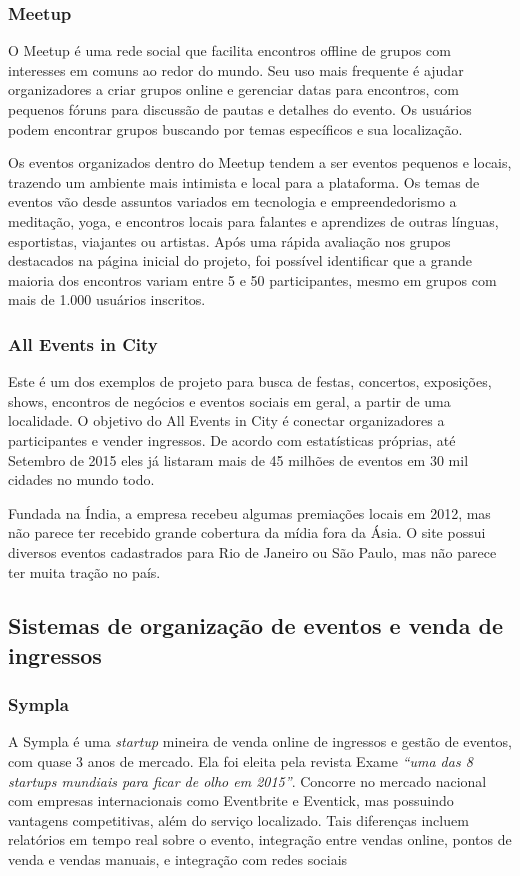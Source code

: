 \documentclass[12pt,a4paper,twoside,hyphens,english,brazil]{abntex2}
\begin{document}
\subsubsection*{Meetup}\label{sec:meetup}
O Meetup é uma rede social que facilita encontros offline de grupos com interesses em comuns ao redor do mundo. Seu uso mais frequente é ajudar organizadores a criar grupos online e gerenciar datas para encontros, com pequenos fóruns para discussão de pautas e detalhes do evento. Os usuários podem encontrar grupos buscando por temas específicos e sua localização.

Os eventos organizados dentro do Meetup tendem a ser eventos pequenos e locais, trazendo um ambiente mais intimista e local para a plataforma. Os temas de eventos vão desde assuntos variados em tecnologia e empreendedorismo a meditação, yoga, e encontros locais para falantes e aprendizes de outras línguas, esportistas, viajantes ou artistas. Após uma rápida avaliação nos grupos destacados na página inicial do projeto, foi possível identificar que a grande maioria dos encontros variam entre 5 e 50 participantes, mesmo em grupos com mais de 1.000 usuários inscritos.

\subsubsection*{All Events in City}
Este é um dos exemplos de projeto para busca de festas, concertos, exposições, shows, encontros de negócios e eventos sociais em geral, a partir de uma localidade. O objetivo do All Events in City é conectar organizadores a participantes e vender ingressos. De acordo com estatísticas próprias, até Setembro de 2015 eles já listaram mais de 45 milhões de eventos em 30 mil cidades no mundo todo\cite{alleventsincity-wikipedia}.

Fundada na Índia, a empresa recebeu algumas premiações locais em 2012, mas não parece ter recebido grande cobertura da mídia fora da Ásia. O site possui diversos eventos cadastrados para Rio de Janeiro ou São Paulo, mas não parece ter muita tração no país.

\subsection{Sistemas de organização de eventos e venda de ingressos} \label{sec:concorrencia:venda}

\subsubsection*{Sympla}
A Sympla é uma \emph{startup} mineira de venda online de ingressos e gestão de eventos, com quase 3 anos de mercado. Ela foi eleita pela revista Exame \emph{``uma das 8 startups mundiais para ficar de olho em 2015''}\cite{exame-8-startups}. Concorre no mercado nacional com empresas internacionais como Eventbrite e Eventick, mas possuindo vantagens competitivas, além do serviço localizado. Tais diferenças incluem relatórios em tempo real sobre o evento, integração entre vendas online, pontos de venda e vendas manuais, e integração com redes sociais
\end{document}
